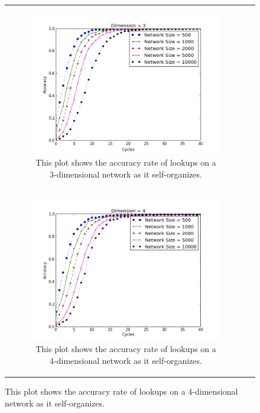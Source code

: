 \documentclass[11pt, conference, letterpaper]{IEEEtran}
\begin{document}
\begin{figure}
\begin{tabular}{cc}
		\begin{subfigure}{\columnwidth}
			\includegraphics[width=\columnwidth]{conv_d3}
			\caption{This plot shows the accuracy rate of lookups on a 3-dimensional network as it self-organizes.}
			\label{conv3}
		\end{subfigure} \\
		
		\begin{subfigure}{\columnwidth}
			\includegraphics[width=\linewidth]{conv_d4}
			\caption{This plot shows the accuracy rate of lookups on a 4-dimensional network as it self-organizes.}
			\label{conv4}
		\end{subfigure} &
		

\end{tabular}
\end{figure}
\end{document}
